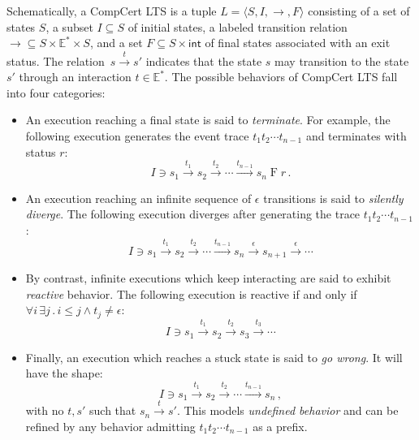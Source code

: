 \documentclass[sigplan,10pt,review,anonymous]{acmart}
\newcommand{\kw}[1]{\ensuremath{ \mathsf{#1} }}
\begin{document}
Schematically, a CompCert LTS
is a tuple
$L = \langle S, I, {\rightarrow}, F \rangle$
consisting of
a set of states $S$,
a subset $I \subseteq S$ of initial states,
a labeled transition relation
${\rightarrow} \subseteq S \times \mathbb{E}^* \times S$,
and a set
$F \subseteq S \times \kw{int}$
of final states associated with an exit status.
The relation~$s \stackrel{t}{\rightarrow} s'$
indicates that the state $s$ may transition to the state $s'$
through an interaction $t \in \mathbb{E}^*$.
The possible behaviors of CompCert LTS fall into four categories:
\begin{itemize}
\item An execution reaching a final state is said to
    \emph{terminate}.
    For example,
    the following execution generates
    the event trace $t_1 t_2 \cdots t_{n-1}$
    and terminates with status $r$:
    \[
        I \ni s_1 \stackrel{t_1}{\rightarrow}
          s_2 \stackrel{t_2}{\rightarrow}
          \cdots \stackrel{t_{n-1}}{\rightarrow}
          s_n \mathrel{F} r \,.
    \]
\item An execution reaching
    an infinite sequence of $\epsilon$ transitions
    is said to \emph{silently diverge}.
    The following execution diverges after
    generating the trace $t_1 t_2 \cdots t_{n-1}$:
    \[
        I \ni s_1 \stackrel{t_1}{\rightarrow}
          s_2 \stackrel{t_2}{\rightarrow}
          \cdots \stackrel{t_{n-1}}{\rightarrow}
          s_n \stackrel{\epsilon}{\rightarrow}
          s_{n+1} \stackrel{\epsilon}{\rightarrow}
          \cdots
    \]
\item By contrast,
    infinite executions which keep interacting
    are said to exhibit \emph{reactive} behavior.
    The following execution
    is reactive if and only if
    $\forall i \, \exists j \,.\, i \le j \wedge t_j \ne \epsilon$:
    \[
        I \ni s_1 \stackrel{t_1}{\rightarrow}
          s_2 \stackrel{t_2}{\rightarrow}
          s_3 \stackrel{t_3}{\rightarrow}
          \cdots
    \]
\item Finally, an execution which reaches a stuck state
    is said to \emph{go wrong}. It will have the shape:
    \[
        I \ni s_1 \stackrel{t_1}{\rightarrow}
          s_2 \stackrel{t_2}{\rightarrow}
          \cdots \stackrel{t_{n-1}}{\rightarrow}
          s_n \,,
    \]
    with no $t, s'$ such that
    $s_n \stackrel{t}{\rightarrow} s'$.
    This models \emph{undefined behavior}
    and can be refined by any behavior
    admitting $t_1 t_2 \cdots t_{n-1}$ as a prefix.
\end{itemize}
\end{document}
